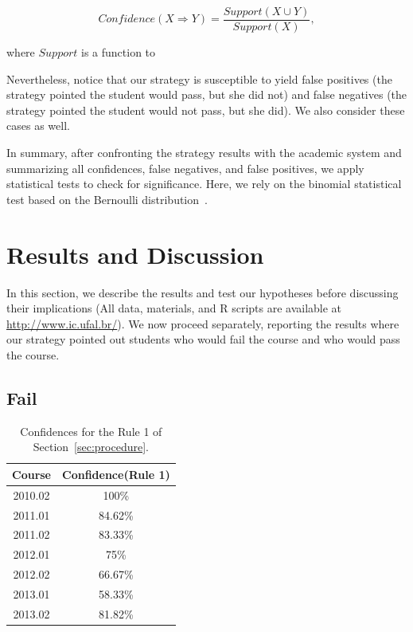 $$
Confidence(X \Rightarrow Y) = \frac{Support(X \cup Y)}{Support(X)},
$$

where $Support$ is a function to \todots

Nevertheless, notice that our strategy is susceptible to yield false positives (the strategy pointed the student would pass, but she did not) and false negatives (the strategy pointed the student would not pass, but she did). We also consider these cases as well. %


In summary, after confronting the strategy results with the academic system and summarizing all confidences, false negatives, and false positives, we apply statistical tests to check for significance. Here, we rely on the binomial statistical test based on the Bernoulli distribution~\cite{}.

\section{Results and Discussion}

In this section, we describe the results and test our hypotheses before discussing their implications (All data, materials, and R scripts are available at \url{http://www.ic.ufal.br/}). We now proceed separately, reporting the results where our strategy pointed out students who would fail the course and who would pass the course.

\subsection{Fail}

\begin{table}[h]
\centering
\begin{tabular}{|c|c|}
\hline
\textbf{Course} & \textbf{Confidence(Rule 1)}\\ \hline
2010.02 & 100\%\\ \hline
2011.01 & 84.62\% \\ \hline
2011.02 & 83.33\% \\ \hline
2012.01 & 75\% \\ \hline
2012.02 & 66.67\% \\ \hline
2013.01 & 58.33\% \\ \hline
2013.02 & 81.82\% \\ \hline
\end{tabular}
\caption{Confidences for the Rule 1 of Section~\ref{sec:procedure}.}
\label{tab:confidences}
\end{table}

